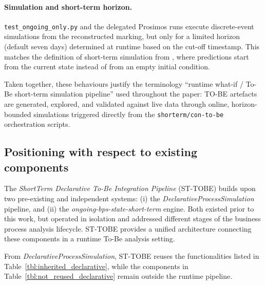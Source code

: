 \documentclass[a4paper,fleqn]{cas-sc}
\begin{document}
\paragraph{Simulation and short-term horizon.}
\verb|test_ongoing_only.py| and the delegated Prosimos runs execute
discrete-event simulations from the reconstructed marking, but only for a
limited horizon (default seven days) determined at runtime based on the
cut-off timestamp. This matches the definition of short-term simulation
from \citep{Avramenko2025arXiv}, where predictions start from the current
state instead of from an empty initial condition.

Taken together, these behaviours justify the terminology
``runtime what-if / To-Be short-term simulation pipeline'' used throughout
the paper: TO-BE artefacts are generated, explored, and validated against
live data through online, horizon-bounded simulations triggered directly
from the \verb|shorterm/con-to-be| orchestration scripts.

\subsection{Positioning with respect to existing components}

The \emph{ShortTerm Declarative To-Be Integration Pipeline} (ST-TOBE)
builds upon two pre-existing and independent systems:
(i) the \emph{DeclarativeProcessSimulation} pipeline, and 
(ii) the \emph{ongoing-bps-state-short-term} engine.
Both existed prior to this work, but operated in isolation and
addressed different stages of the business process analysis lifecycle.
ST-TOBE provides a unified architecture connecting these components in a 
runtime To-Be analysis setting.

From \emph{DeclarativeProcessSimulation}, ST-TOBE reuses the
functionalities listed in Table~\ref{tbl:inherited_declarative}, while the 
components in Table~\ref{tbl:not_reused_declarative} remain outside the
runtime pipeline.
\end{document}
